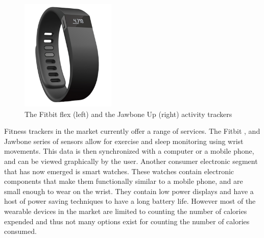 \begin{figure}
\begin{center}
\includegraphics[width=0.4\textwidth]{images/JawFit.png}
\caption{The Fitbit flex (left) and the Jawbone Up (right) activity trackers}
\label{fig:FitbitJawbone}

\end{center}
\end{figure}
Fitness trackers in the market currently offer a range of services. The Fitbit \cite{Web:FitBitOfficial},\cite{Web:FitbitFlex} and Jawbone \cite{Web:JawBoneWebsite} series of sensors allow for exercise and sleep monitoring using wrist movements. This data is then synchronized with a computer or a mobile phone, and can be viewed graphically by the user. Another consumer electronic segment that has now emerged is smart watches. These watches contain electronic components that make them functionally similar to a mobile phone, and are small enough to wear on the wrist. They contain low power displays and have a host of power saving techniques to have a long battery life. However most of the wearable devices in the market are limited to counting the number of calories expended and thus not many options exist for counting the number of calories consumed.

